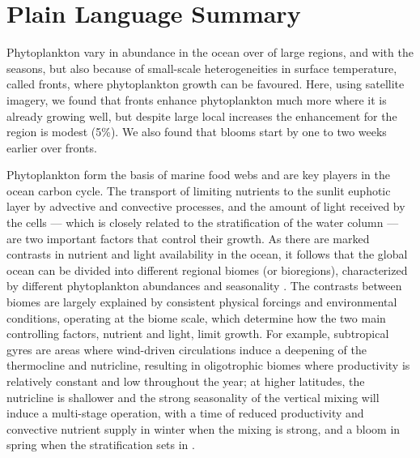 \section*{Plain Language Summary}
Phytoplankton vary in abundance in the ocean over of large regions, and with the seasons, but also because of small-scale heterogeneities in surface temperature, called fronts, where phytoplankton growth can be favoured.
Here, using satellite imagery, we found that fronts enhance phytoplankton much more where it is already growing well, but despite large local increases the  enhancement for the region is modest (5\%). We also found that blooms start by one to two weeks earlier over fronts.


\introduction{}

Phytoplankton form the basis of marine food webs and are key players in the ocean carbon cycle.
The transport of limiting nutrients to the sunlit euphotic layer by advective and convective processes, and the amount of light received by the cells --- which is closely related to the stratification of the water column --- are two important factors that control their growth.
As there are marked contrasts in nutrient and light availability in the ocean, it follows that the global ocean can be divided into different regional biomes (or bioregions), characterized by different phytoplankton abundances and seasonality \parencite{longhurst_2007, vichi_2011a, bock_2022}.
The contrasts between biomes are largely explained by consistent physical forcings and environmental conditions, operating at the biome scale, which determine how the two main controlling factors, nutrient and light, limit growth.
For example, subtropical gyres are areas where wind-driven circulations induce a deepening of the thermocline and nutricline, resulting in oligotrophic biomes where productivity is relatively constant and low throughout the year; at higher latitudes, the nutricline is shallower and the strong seasonality of the vertical mixing will induce a multi-stage operation, with a time of reduced productivity and convective nutrient supply in winter when the mixing is strong, and a bloom in spring when the stratification sets in \parencite{wilson_2005, williams_2011}.

